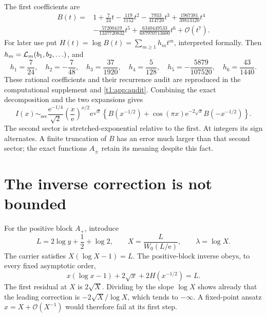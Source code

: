 \documentclass[11pt,openany]{book}
\numberwithin{equation}{chapter}
\theoremstyle{plain}
\theoremstyle{definition}
\theoremstyle{remark}
\newcommand{\ee}{\mathrm e}
\newcommand{\OO}{\mathcal O}\newcommand{\bigO}{\mathcal O}
\newcommand{\sectorsim}{\mathrel{\sim_{\mathrm{sec}}}}
\begin{document}
The first coefficients are
\begin{align}
 B(t)={}&1+\frac7{24}t-\frac{119}{1152}t^2
 -\frac{7933}{414720}t^3+\frac{1967381}{39813120}t^4\nonumber\\
 &-\frac{57200419}{1337720832}t^5
 +\frac{6340449533}{687970713600}t^6+\OO(t^7).
 \label{t1:eq:ivfirstcoeff}
\end{align}
For later use put $H(t)=\log B(t)=\sum_{m\ge1}h_mt^m$, interpreted formally. Then $h_m=\mathcal L_m(b_1,b_2,\ldots)$, and
\begin{equation}
 h_1=\frac7{24},\quad h_2=-\frac7{48},\quad
 h_3=\frac{37}{1920},\quad h_4=\frac5{128},\quad
 h_5=-\frac{5879}{107520},\quad h_6=\frac{43}{1440}.
 \label{t1:eq:ivlogcoeff}
\end{equation}
These rational coefficients and their recurrence audit are reproduced in the computational supplement and \cref{t1:app:audit}.
Combining the exact decomposition and the two expansions gives
\begin{equation}
 I(x)\sectorsim
 \frac{\ee^{-1/4}}{\sqrt2}\left(\frac{x}{\ee}\right)^{x/2}\ee^{\sqrt x}
 \left\{B(x^{-1/2})+\cos(\pi x)\ee^{-2\sqrt x}B(-x^{-1/2})\right\}.
 \label{t2:eq:involution-transseries}
\end{equation}
The second sector is stretched-exponential relative to the first. At integers its sign alternates. A finite truncation of $B$ has an error much larger than that second sector; the exact functions $A_\pm$ retain its meaning despite this fact.

\section{The inverse correction is not bounded}
\label{ct:sec:inv-inverse}

For the positive block $A_+$, introduce
\begin{equation}
 L=2\log y+\frac12+\log2,\qquad
 X=\frac{L}{W_0(L/\ee)},\qquad \lambda=\log X.
 \label{t1:eq:ivcore}
\end{equation}
The carrier satisfies $X(\log X-1)=L$. The positive-block inverse obeys, to every fixed asymptotic order,
\begin{equation}
 x(\log x-1)+2\sqrt x+2H(x^{-1/2})=L.
 \label{t1:eq:ivinveq}
\end{equation}
The first residual at $X$ is $2\sqrt X$. Dividing by the slope $\log X$ shows already that the leading correction is $-2\sqrt X/\log X$, which tends to $-\infty$. A fixed-point ansatz $x=X+\OO(X^{-1})$ would therefore fail at its first step.
\end{document}
